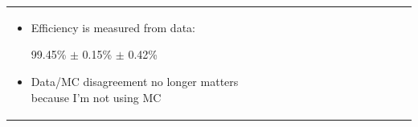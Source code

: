 \documentclass[landscape]{article}
\begin{document}
\begin{tabular}{p{0.6\linewidth} p{0.4\linewidth}}
\begin{minipage}{1.1\linewidth}
    \begin{itemize}

      \item Efficiency is measured from data:
\begin{center} 99.45\% $\pm$ 0.15\% $\pm$ 0.42\% \end{center}

\vspace{1 cm}
      \item Data/MC disagreement no longer matters because I'm
      not using MC

    \end{itemize}

  \end{minipage} \\
\end{tabular}

\pagebreak
\end{document}
